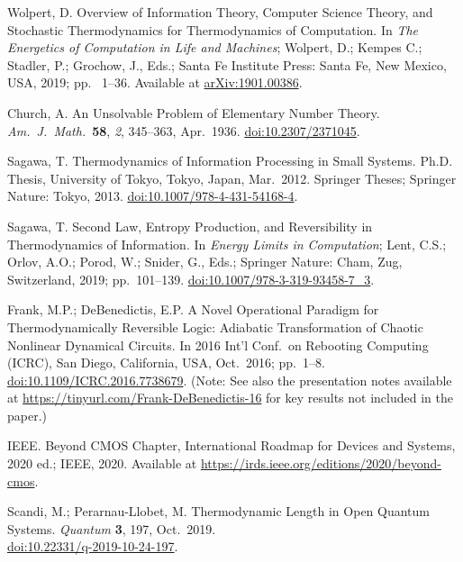 \documentclass[preprints,article,accept,moreauthors,pdftex]{Definitions/mdpi}
\begin{document}
\begin{thebibliography}{999}
Wolpert, D\@. Overview of Information Theory, Computer Science Theory, and Stochastic Thermodynamics for Thermodynamics of Computation. In \emph{The Energetics of Computation in Life and Machines}; Wolpert, D.; Kempes C.; Stadler, P.; Grochow, J., Eds.; Santa Fe Institute Press: Santa Fe, New Mexico, USA, 2019; pp.~ 1--36. Available at \href{https://arxiv.org/abs/1901.00386}{arXiv:1901.00386}.

Church, A\@. An Unsolvable Problem of Elementary Number Theory. {\em Am.\ J.\ Math.}\ {\bf 58}, {\em 2}, 345--363, Apr.\ 1936. \href{https://doi.org/10.2307/2371045}{doi:10.2307/2371045}.

Sagawa, T\@. Thermodynamics of Information Processing in Small Systems. Ph.D. Thesis, University of Tokyo, Tokyo, Japan, Mar.\ 2012. Springer Theses; Springer Nature: Tokyo, 2013. \href{https://doi.org/10.1007/978-4-431-54168-4}{doi:10.1007/978-4-431-54168-4}.

Sagawa, T\@. Second Law, Entropy Production, and Reversibility in Thermodynamics of Information. In \emph{Energy Limits in Computation}; Lent, C.S.; Orlov, A.O.; Porod, W.; Snider, G., Eds.; Springer Nature: Cham, Zug, Switzerland, 2019; pp.~101--139. \href{https://doi.org/10.1007/978-3-319-93458-7_3}{doi:10.1007/978-3-319-93458-7\_3}.

Frank, M.P.; DeBenedictis, E.P\@. A Novel Operational Paradigm for Thermodynamically Reversible Logic: Adiabatic Transformation of Chaotic Nonlinear Dynamical Circuits. In 2016 Int'l Conf.\ on Rebooting Computing (ICRC), San Diego, California, USA, Oct.\ 2016; pp.~1--8. \href{https://doi.org/10.1109/ICRC.2016.7738679}{doi:10.1109/ICRC.2016.7738679}. (Note: See also the presentation notes available at \href{https://tinyurl.com/Frank-DeBenedictis-16}{https://tinyurl.com/Frank-DeBenedictis-16} for key results not included in the paper.)

IEEE. Beyond CMOS Chapter, International Roadmap for Devices and Systems, 2020 ed.; IEEE, 2020. Available at \href{https://irds.ieee.org/editions/2020/beyond-cmos}{https://irds.ieee.org/editions/2020/beyond-cmos}.

Scandi, M.; Perarnau-Llobet, M\@. Thermodynamic Length in Open Quantum Systems. {\em Quantum} {\bf 3}, 197, Oct.\ 2019.
\\[0pt]
\href{https://doi.org/10.22331/q-2019-10-24-197}{doi:10.22331/q-2019-10-24-197}.


\end{thebibliography}
\end{document}
